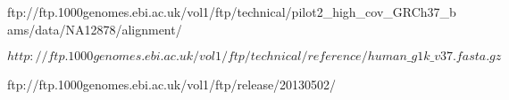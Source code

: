 


\renewcommand{\bibname}{References}

% 


\begin{thebibliography}{99}

 ftp://ftp.1000genomes.ebi.ac.uk/vol1/ftp/technical/pilot2\_high\_cov\_GRCh37\_bams/data/NA12878/alignment/

$http://ftp.1000genomes.ebi.ac.uk/vol1/ftp/technical/reference/human\_g1k\_v37.fasta.gz$

ftp://ftp.1000genomes.ebi.ac.uk/vol1/ftp/release/20130502/


\end{thebibliography}
